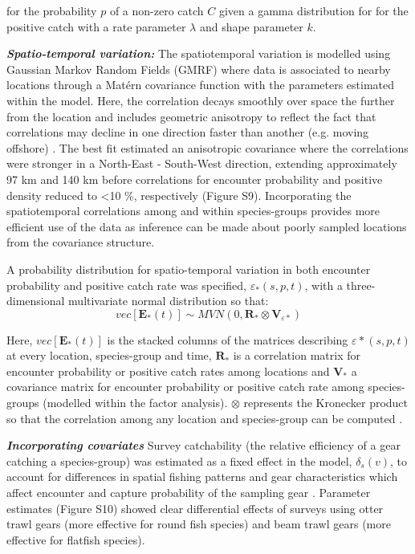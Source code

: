 \documentclass{nature}
\begin{document}
\begin{linenumbers}
for the probability $p$ of a non-zero catch $C$ given a gamma distribution for
for the positive catch with a rate parameter $\lambda$ and shape parameter $k$.

\textbf{\textit{Spatio-temporal variation:}} The spatiotemporal variation is
modelled using Gaussian Markov Random Fields (GMRF) where data is associated to
nearby locations through a Matérn covariance function with the parameters
estimated within the model. Here, the correlation decays smoothly over space
the further from the location and includes geometric anisotropy to reflect the
fact that correlations may decline in one direction faster than another (e.g.
moving offshore) \cite{Thorson2013}.  The best fit estimated an anisotropic
covariance where the correlations were stronger in a North-East - South-West
direction, extending approximately 97 km and 140 km before correlations for
encounter probability and positive density reduced to \textless 10 \%,
respectively (Figure S9).  Incorporating the spatiotemporal correlations among
and within species-groups provides more efficient use of the data as inference
can be made about poorly sampled locations from the covariance structure.

A probability distribution for spatio-temporal variation in both encounter
probability and positive catch rate was specified, $\varepsilon_{*}(s,p,t)$,
with a three-dimensional multivariate normal distribution so that:
	\begin{equation}
		vec[\mathbf{E}_{*}(t)] \sim MVN(0,\mathbf{R}_{*} \otimes
		\mathbf{V}_{{\varepsilon}{*}})
	\end{equation}

Here, $vec[\mathbf{E}_{*}(t)]$ is the stacked columns of the matrices
describing $\varepsilon{*}(s,p,t)$ at every location, species-group and time,
$\mathbf{R}_{*}$ is a correlation matrix for encounter probability or positive
catch rates among locations and $\mathbf{V}_{*}$ a covariance matrix for
encounter probability or positive catch rate among species-groups (modelled
within the factor analysis). $\otimes$ represents the Kronecker product so that
the correlation among any location and species-group can be computed
\cite{Thorson2017}.
		
\textbf{\textit{Incorporating covariates}} Survey catchability (the relative
efficiency of a gear catching a species-group) was estimated as a fixed effect
in the model, $\delta_{s}(v)$, to account for differences in spatial fishing
patterns and gear characteristics which affect encounter and capture
probability of the sampling gear \cite{Thorson2014}. Parameter estimates
(Figure S10) showed clear differential effects of surveys using otter trawl
gears (more effective for round fish species) and beam trawl gears (more
effective for flatfish species).


\end{linenumbers}
\end{document}
